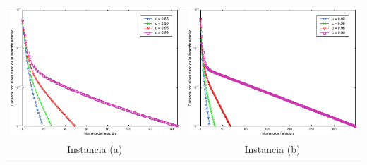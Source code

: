             \noindent{} \begin{minipage}{\textwidth}
                \begin{center}
                    \vspace{1em}

                    \begin{tabular}{cc}
                        \includegraphics{graficos/exp2-a.pdf} & \includegraphics{graficos/exp2-b.pdf} \\
                        {\small Instancia (a)}                & {\small Instancia (b)}
                    \end{tabular}
                \end{center}
            \end{minipage}

